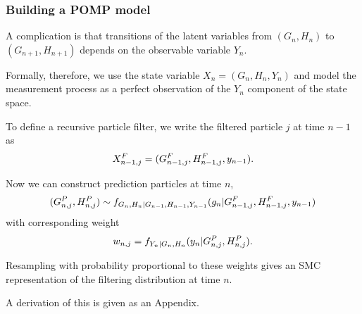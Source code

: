 \documentclass{beamer}\usepackage[]{graphicx}\usepackage[]{color}
\begin{document}
\begin{frame}[fragile]

\frametitle{Building a POMP model}

\vspace{-2mm}

\bi

\item A complication is that transitions of the latent variables from $(G_n,H_n)$ to $(G_{n+1},H_{n+1})$ depends on the observable variable $Y_{n}$. 

\item Formally, therefore, we use the state variable $X_n=(G_{n},H_{n},Y_{n})$ and model the measurement process as a perfect observation of the $Y_n$ component of the state space. 

\item To define a recursive particle filter, we write the filtered particle $j$ at time $n-1$ as 
$$ X^F_{n-1,j}=(G^F_{n-1,j},H^F_{n-1,j},y_{n-1}).$$

\item Now we can construct prediction particles at time $n$,
$$(G^P_{n,j},H^P_{n,j})\sim f_{G_{n},H_n|G_{n-1},H_{n-1},Y_{n-1}}(g_n|G^F_{n-1,j},H^F_{n-1,j},y_{n-1})$$
with corresponding weight 
$$w_{n,j}=f_{Y_n|G_n,H_n}(y_n|G^P_{n,j},H^P_{n,j}).$$

\item Resampling with probability proportional to these weights gives an SMC representation of the filtering distribution at time $n$.

\item A derivation of this is given as an Appendix. 


\ei


\end{frame}
\end{document}
